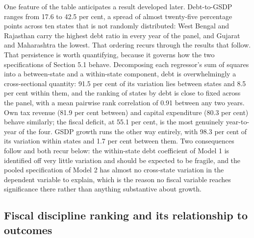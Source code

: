 \documentclass[12pt,a4paper]{article}
\begin{document}
One feature of the table anticipates a result developed later. Debt-to-GSDP ranges from 17.6 to 42.5 per cent, a spread of almost twenty-five percentage points across ten states that is not randomly distributed: West Bengal and Rajasthan carry the highest debt ratio in every year of the panel, and Gujarat and Maharashtra the lowest. That ordering recurs through the results that follow. That persistence is worth quantifying, because it governs how the two specifications of Section 5.1 behave. Decomposing each regressor's sum of squares into a between-state and a within-state component, debt is overwhelmingly a cross-sectional quantity: 91.5 per cent of its variation lies between states and 8.5 per cent within them, and the ranking of states by debt is close to fixed across the panel, with a mean pairwise rank correlation of 0.91 between any two years. Own tax revenue (81.9 per cent between) and capital expenditure (80.3 per cent) behave similarly; the fiscal deficit, at 55.1 per cent, is the most genuinely year-to-year of the four. GSDP growth runs the other way entirely, with 98.3 per cent of its variation within states and 1.7 per cent between them. Two consequences follow and both recur below: the within-state debt coefficient of Model 1 is identified off very little variation and should be expected to be fragile, and the pooled specification of Model 2 has almost no cross-state variation in the dependent variable to explain, which is the reason no fiscal variable reaches significance there rather than anything substantive about growth.

\subsection{Fiscal discipline ranking and its relationship to outcomes}
\end{document}
